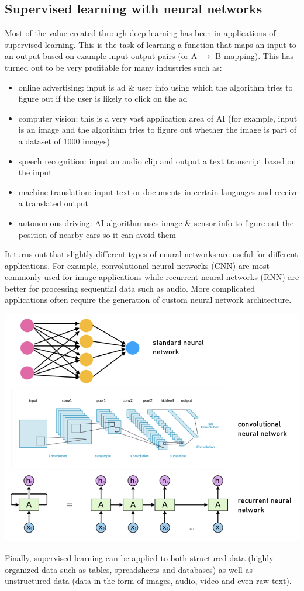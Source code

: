 \documentclass{article}[a4paper,12pt]
\theoremstyle{definition}
\begin{document}
\subsection{Supervised learning with neural networks}
Most of the value created through deep learning has been in applications of supervised learning. This is the task of learning a function that maps an input to an output based on example input-output pairs (or A $\rightarrow$ B mapping). This has turned out to be very profitable for many industries such as:
\begin{itemize}
	\item online advertising: input is ad \& user info using which the algorithm tries to figure out if the user is likely to click on the ad
	\item computer vision: this is a very vast application area of AI (for example, input is an image and the algorithm tries to figure out whether the image is part of a dataset of 1000 images)
	\item speech recognition: input an audio clip and output a text transcript based on the input
	\item machine translation: input text or documents in certain languages and receive a translated output
	\item autonomous driving: AI algorithm uses image \& sensor info to figure out the position of nearby cars so it can avoid them
\end{itemize}
It turns out that slightly different types of neural networks are useful for different applications. For example, convolutional neural networks (CNN) are most commonly used for image applications while recurrent neural networks (RNN) are better for processing sequential data such as audio. More complicated applications often require the generation of custom neural network architecture.
\begin{center}
\includegraphics{types_of_nn.png}
\end{center}
Finally, supervised learning can be applied to both structured data (highly organized data such as tables, spreadsheets and databases) as well as unstructured data (data in the form of images, audio, video and even raw text).
\end{document}
